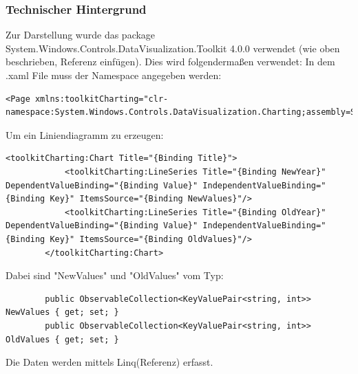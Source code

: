 \subsubsection{Technischer Hintergrund}
Zur Darstellung wurde das package System.Windows.Controls.DataVisualization.Toolkit 4.0.0 verwendet (wie oben beschrieben, Referenz einfügen). 
Dies wird folgendermaßen verwendet: 
In dem .xaml File muss der Namespace angegeben werden: 
\begin{lstlisting}
<Page xmlns:toolkitCharting="clr-namespace:System.Windows.Controls.DataVisualization.Charting;assembly=System.Windows.Controls.DataVisualization.Toolkit">
\end{lstlisting}
Um ein Liniendiagramm zu erzeugen:
\begin{lstlisting}
<toolkitCharting:Chart Title="{Binding Title}">
            <toolkitCharting:LineSeries Title="{Binding NewYear}"  DependentValueBinding="{Binding Value}" IndependentValueBinding="{Binding Key}" ItemsSource="{Binding NewValues}"/>
            <toolkitCharting:LineSeries Title="{Binding OldYear}"  DependentValueBinding="{Binding Value}" IndependentValueBinding="{Binding Key}" ItemsSource="{Binding OldValues}"/>
        </toolkitCharting:Chart>
\end{lstlisting}
Dabei sind "NewValues" und "OldValues" vom Typ: 
\begin{lstlisting}
        public ObservableCollection<KeyValuePair<string, int>> NewValues { get; set; }
        public ObservableCollection<KeyValuePair<string, int>> OldValues { get; set; }
\end{lstlisting}
Die Daten werden mittels Linq(Referenz) erfasst.